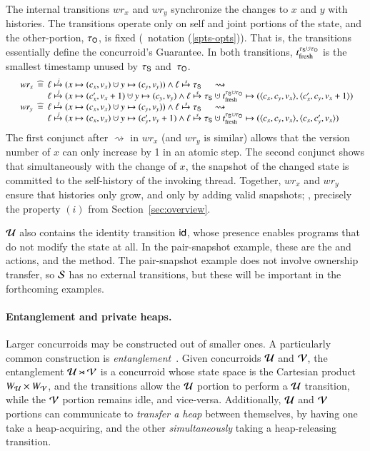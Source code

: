The internal transitions $wr_x$ and $wr_y$ synchronize the changes to
$x$ and $y$ with histories. The transitions operate only on self and
joint portions of the state, and the other-portion, $\tau_{\mathsf{O}}$, is fixed
(\cf\ notation (\ref{spts-opts})). That is, the transitions
essentially define the concurroid's Guarantee. In both transitions,
$\tfr{\histS \hunion \histO}$ is the smallest timestamp unused by
$\tau_{\mathsf{S}}$ and~$\tau_{\mathsf{O}}$.
%
%
\[ 
{\small 
  \begin{array}{l@{\ }c@{\ }l@{\ }c}
    wr_x & \eqdef &\hps \jpts (x \hpts (c_x, v_x) \hunion y
    \hpts (c_y, v_y))  \aand 
    \hps \spts \histL ~~~~~\rightsquigarrow \\
    & &
    \hps \jpts (x \hpts (c'_x, v_x + 1) \hunion y \hpts (c_y, v_y) \aand \hps \spts \histL \hunion \tfr{\histS \hunion \histO} \hpts (\angled{c_x, c_y, v_x},\angled{c'_x, c_y, v_x+1})
    \\
    wr_y & \eqdef & \hps \jpts (x \hpts (c_x, v_x) \hunion y
    \hpts (c_y, v_y)) \aand \hps \spts \histL ~~~~~\rightsquigarrow \\
    && \hps \jpts (x \hpts (c_x, v_x) \hunion y \hpts (c'_y, v_y
    +1) \aand \hps \spts \histL \hunion \tfr{\histS \hunion \histO} \hpts (\angled{c_x, c_y, v_x},\angled{c_x, c'_y, v_x})
    \end{array}
}\] 
%
The first conjunct after $\rightsquigarrow$ in $wr_x$ (and $wr_y$ is
similar) allows that the version number of $x$ can only increase by 1
in an atomic step. The second conjunct shows that simultaneously with
the change of $x$, the snapshot of the changed state is committed to
the self-history of the invoking thread.
%
Together, $wr_x$ and $wr_y$ ensure that histories only grow, and only
by adding valid snapshots; \ie, precisely the property $(i)$ from
Section~\ref{sec:overview}.
%

$\mathcal{U}$ also contains the identity transition $\mathsf{id}$, whose presence
enables programs that do not modify the state at all. In the
pair-snapshot example, these are the  and 
actions, and the  method.  The pair-snapshot example
does not involve ownership transfer, so $\mathcal{S}$ has no external
transitions, but these will be important in the forthcoming examples.

\paragraph{Entanglement and private heaps.} 
Larger concurroids may be constructed out of smaller ones. A
particularly common construction is
\emph{entanglement}~\cite{Nanevski-al:ESOP14}. Given concurroids
$\mathcal{U}$ and $\mathcal{V}$, the entanglement $\mathcal{U} \rtimes \mathcal{V}$ is a
concurroid whose state space is the Cartesian product $W_{\mathcal{U}}
\times W_{\mathcal{V}}$, and the transitions allow the $\mathcal{U}$ portion to
perform a $\mathcal{U}$ transition, while the $\mathcal{V}$ portion remains idle,
and vice-versa. Additionally, $\mathcal{U}$ and $\mathcal{V}$ portions can
communicate to \emph{transfer a heap} between themselves, by having
one take a heap-acquiring, and the other \emph{simultaneously} taking
a heap-releasing transition.

